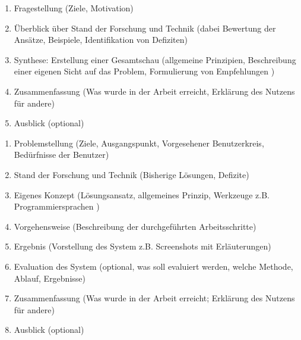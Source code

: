 \label{sec:anhang}

\label{subsec:a1}

\begin{enumerate}
    \item{Fragestellung (Ziele, Motivation)}
    \item{Überblick über Stand der Forschung und Technik (dabei Bewertung der Ansätze, Beispiele, Identifikation von Defiziten)}
    \item{Synthese: Erstellung einer Gesamtschau (allgemeine Prinzipien, Beschreibung einer eigenen Sicht auf das Problem, Formulierung von Empfehlungen )}
    \item{Zusammenfassung (Was wurde in der Arbeit erreicht, Erklärung des Nutzens für andere)}
    \item{Ausblick (optional)}
\end{enumerate}

\label{subsec:a2}

\begin{enumerate}
    \item{Problemstellung (Ziele, Ausgangspunkt, Vorgesehener Benutzerkreis, Bedürfnisse der Benutzer)}
    \item{Stand der Forschung und Technik (Bisherige Lösungen, Defizite)}
    \item{Eigenes Konzept (Lösungsansatz, allgemeines Prinzip, Werkzeuge z.B. Programmiersprachen )}
    \item{Vorgehensweise (Beschreibung der durchgeführten Arbeitsschritte)}
    \item{Ergebnis (Vorstellung des System z.B. Screenshots mit Erläuterungen)}
    \item{Evaluation des System (optional, was soll evaluiert werden, welche Methode, Ablauf, Ergebnisse)}
    \item{Zusammenfassung (Was wurde in der Arbeit erreicht; Erklärung des Nutzens für andere)}
    \item{Ausblick (optional)}
\end{enumerate}

\label{subsec:a3}

